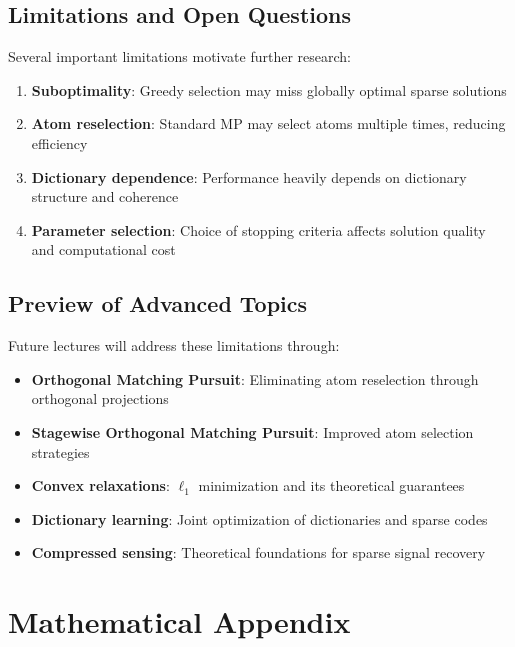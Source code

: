 \documentclass[12pt]{article}
\begin{document}
\subsection{Limitations and Open Questions}

Several important limitations motivate further research:

\begin{enumerate}
    \item \textbf{Suboptimality}: Greedy selection may miss globally optimal sparse solutions
    \item \textbf{Atom reselection}: Standard MP may select atoms multiple times, reducing efficiency
    \item \textbf{Dictionary dependence}: Performance heavily depends on dictionary structure and coherence
    \item \textbf{Parameter selection}: Choice of stopping criteria affects solution quality and computational cost
\end{enumerate}

\subsection{Preview of Advanced Topics}

Future lectures will address these limitations through:

\begin{itemize}
    \item \textbf{Orthogonal Matching Pursuit}: Eliminating atom reselection through orthogonal projections
    \item \textbf{Stagewise Orthogonal Matching Pursuit}: Improved atom selection strategies
    \item \textbf{Convex relaxations}: $\ell_1$ minimization and its theoretical guarantees
    \item \textbf{Dictionary learning}: Joint optimization of dictionaries and sparse codes
    \item \textbf{Compressed sensing}: Theoretical foundations for sparse signal recovery
\end{itemize}

\newpage

\appendix

\section{Mathematical Appendix}
\end{document}
